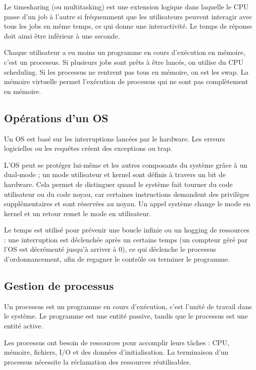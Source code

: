 	Le timesharing (ou multitasking) est une extension logique dans laquelle le CPU passe d'un job à l'autre si fréquemment que les utilisateurs peuvent interagir avec tous les jobs en même temps, ce qui donne une interactivité. Le temps de réponse doit ainsi être inférieur à une seconde.
	
	Chaque utilisateur a eu moins un programme en cours d'exécution en mémoire, c'est un processus. Si plusieurs jobs sont prêts à être lancés, on utilise du CPU scheduling. Si les processus ne rentrent pas tous en mémoire, on est les swap. La mémoire virtuelle permet l'exécution de processus qui ne sont pas complètement en mémoire.
	
		\subsection{Opérations d'un OS}
		
		Un OS est basé sur les interruptions lancées par le hardware. Les erreurs logicielles ou les requêtes créent des exceptions ou trap.
		
		L'OS peut se protéger lui-même et les autres composants du système grâce à un dual-mode ; un mode utilisateur et kernel sont définis à travers un bit de hardware. Cela permet de distinguer quand le système fait tourner du code utilisateur ou du code noyau, car certaines instructions demandent des privilèges supplémentaires et sont réservées au noyau. Un appel système change le mode en kernel et un retour remet le mode en utilisateur.
		
		
		Le temps est utilisé pour prévenir une boucle infinie ou un hogging de ressources : une interruption est déclenchée après un certains temps (un compteur géré par l'OS est décrémenté jusqu'à arriver à 0), ce qui déclenche le processus d'ordonnancement, afin de regagner le contrôle ou terminer le programme.
		
		\subsection{Gestion de processus}
		
		Un processus est un programme en cours d'exécution, c'est l'unité de travail dans le système. Le programme est une entité passive, tandis que le processus est une entité active.
		
		Les processus ont besoin de ressources pour accomplir leurs tâches : CPU, mémoire, fichiers, I/O et des données d'initialisation. La terminaison d'un processus nécessite la réclamation des ressources réutilisables.
		
